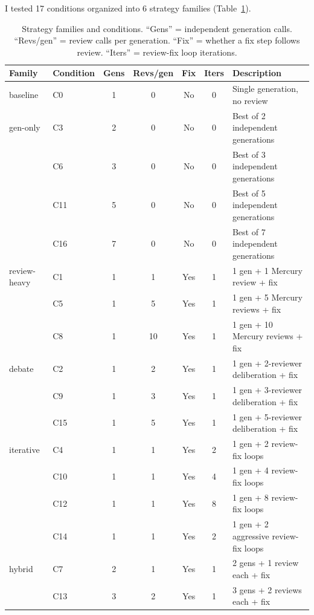 \documentclass{article}
\begin{document}
I tested 17 conditions organized into 6 strategy families (Table~\ref{tab:conditions}).

\begin{table}[t]
\centering
\caption{Strategy families and conditions. ``Gens'' = independent generation calls. ``Revs/gen'' = review calls per generation. ``Fix'' = whether a fix step follows review. ``Iters'' = review-fix loop iterations.}
\label{tab:conditions}
\small
\begin{tabular}{llccccp{4cm}}
\toprule
Family & Condition & Gens & Revs/gen & Fix & Iters & Description \\
\midrule
baseline & C0 & 1 & 0 & No & 0 & Single generation, no review \\
\midrule
gen-only & C3 & 2 & 0 & No & 0 & Best of 2 independent generations \\
         & C6 & 3 & 0 & No & 0 & Best of 3 independent generations \\
         & C11 & 5 & 0 & No & 0 & Best of 5 independent generations \\
         & C16 & 7 & 0 & No & 0 & Best of 7 independent generations \\
\midrule
review-heavy & C1 & 1 & 1 & Yes & 1 & 1 gen + 1 Mercury review + fix \\
             & C5 & 1 & 5 & Yes & 1 & 1 gen + 5 Mercury reviews + fix \\
             & C8 & 1 & 10 & Yes & 1 & 1 gen + 10 Mercury reviews + fix \\
\midrule
debate & C2 & 1 & 2 & Yes & 1 & 1 gen + 2-reviewer deliberation + fix \\
       & C9 & 1 & 3 & Yes & 1 & 1 gen + 3-reviewer deliberation + fix \\
       & C15 & 1 & 5 & Yes & 1 & 1 gen + 5-reviewer deliberation + fix \\
\midrule
iterative & C4 & 1 & 1 & Yes & 2 & 1 gen + 2 review-fix loops \\
          & C10 & 1 & 1 & Yes & 4 & 1 gen + 4 review-fix loops \\
          & C12 & 1 & 1 & Yes & 8 & 1 gen + 8 review-fix loops \\
          & C14 & 1 & 1 & Yes & 2 & 1 gen + 2 aggressive review-fix loops \\
\midrule
hybrid & C7 & 2 & 1 & Yes & 1 & 2 gens + 1 review each + fix \\
       & C13 & 3 & 2 & Yes & 1 & 3 gens + 2 reviews each + fix \\
\bottomrule
\end{tabular}
\end{table}
\end{document}
